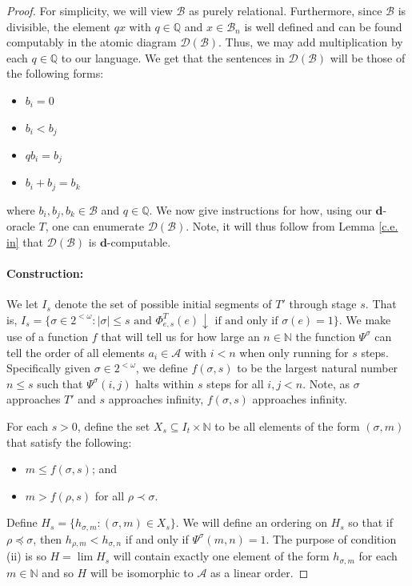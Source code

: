 \documentclass[10pt,a4paper]{amsart}
\newcommand{\A}{\mathcal{A}}
\newcommand{\B}{\mathcal{B}}
\newcommand{\D}{\mathcal{D}}
\newcommand{\N}{\mathbb{N}}
\newcommand{\Q}{\mathbb{Q}}
\newcommand{\ddd}{\boldsymbol{d}}
\newcommand{\lom}{^{< \omega}}
\begin{document}
\begin{proof}
    For simplicity, we will view  $\B $ as purely relational. Furthermore, since $\B$ is divisible, the element $qx$ with $q\in \Q$ and $x\in \B_n$ is well defined and can be found computably in the atomic diagram $\D(\B)$.  
Thus, we may add multiplication by each $q\in \Q$ to our language. We get that the sentences in $\D(\B)$ will be those of the following forms:
\begin{itemize}
    \item $b_i=0$
    \item $b_i<b_j$
    \item $qb_i=b_j$
    \item $b_i + b_j = b_k$
\end{itemize}
where $b_i,b_j,b_k\in \B$ and $q\in \Q$.
We now give instructions for how, using our $\ddd$-oracle $T$, one can enumerate $\D(\B)$. Note, it will thus follow from Lemma \ref{c.e. in} that $\D(\B)$ is $\ddd$-computable.  \\

\paragraph{Construction:}  We let $I_s$ denote the set of possible initial segments of $T'$ through stage $s$. That is, $I_s=\{\sigma \in 2\lom: |\sigma|\leq s \text{ and } \Phi^T_{e,s}(e)\downarrow \text{ if and only if }\sigma(e)=1\}$. We make use of a function $f$ that will tell us for how large an $n\in \N$ the function $\Psi^\sigma$ can tell the order of all elements $a_i\in \A$ with $i<n$ when only running for $s$ steps. Specifically given $\sigma\in 2\lom$, we define $f(\sigma, s)$ to be the largest natural number $n\leq s$ such that $\Psi^\sigma(i,j)$ halts within $s$ steps for all $i,j<n$. Note, as $\sigma$ approaches $T'$ and $s$ approaches infinity, $f(\sigma,s)$ approaches infinity. 

For each $s>0$, define the set $X_s\subseteq I_t \times \N$ to be all elements of the form $(\sigma,m)$ that satisfy the following:

\begin{itemize}
    \item[(i)] $m\leq f(\sigma,s)$; and
    \item[(ii)] $m>f(\rho,s)$ for all $\rho\prec \sigma$.
\end{itemize}

\noindent Define $H_s=\{h_{\sigma,m}: (\sigma,m)\in X_s\}$. We will define an ordering on $H_s$ so that if $\rho\preceq \sigma$, then $h_{\rho,m}<h_{\sigma,n}$ if and only if $\Psi^\sigma (m,n)=1$. The purpose of condition (ii) is so $H=\lim H_s$ will contain exactly one element of the form $h_{\sigma, m}$ for each $m\in \N$ and so $H$ will be isomorphic to $\A$ as a linear order.


\end{proof}
\end{document}
